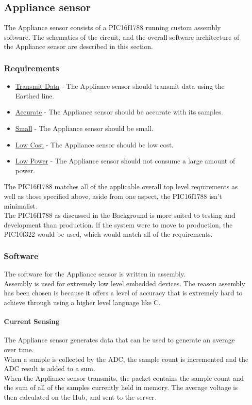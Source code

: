 \documentclass[preprint,12pt,3p]{elsarticle}
\begin{document}
\subsection{Appliance sensor}
The Appliance sensor consists of a PIC16f1788 running custom assembly software. The schematics of the circuit, and the overall software architecture of the Appliance sensor are described in this section.

\subsubsection{Requirements}
\begin{itemize}
\item \underline{Transmit Data} - The Appliance sensor should transmit data using the Earthed line.
\item \underline{Accurate} - The Appliance sensor should be accurate with its samples.
\item \underline{Small} - The Appliance sensor should be small.
\item \underline{Low Cost} - The Appliance sensor should be low cost.
\item \underline{Low Power} - The Appliance sensor should not consume a large amount of power.
\end{itemize}
The PIC16f1788 matches all of the applicable overall top level requirements as well as those specified above, aside from one aspect, the PIC16f1788 isn't minimalist.\\
The PIC16f1788 as discussed in the Background is more suited to testing and development than production. If the system were to move to production, the PIC10f322 would be used, which would match all of the requirements.

\subsubsection{Software}
The software for the Appliance sensor is written in assembly.\\
Assembly is used for extremely low level embedded devices. The reason assembly has been chosen is because it offers a level of accuracy that is extremely hard to achieve through using a higher level language like C.\\

\paragraph{Current Sensing}
The Appliance sensor generates data that can be used to generate an average over time.\\
When a sample is collected by the ADC, the sample count is incremented and the ADC result is added to a sum.\\
When the Appliance sensor transmits, the packet contains the sample count and the sum of all of the samples currently held in memory. The average voltage is then calculated on the Hub, and sent to the server.
\end{document}
